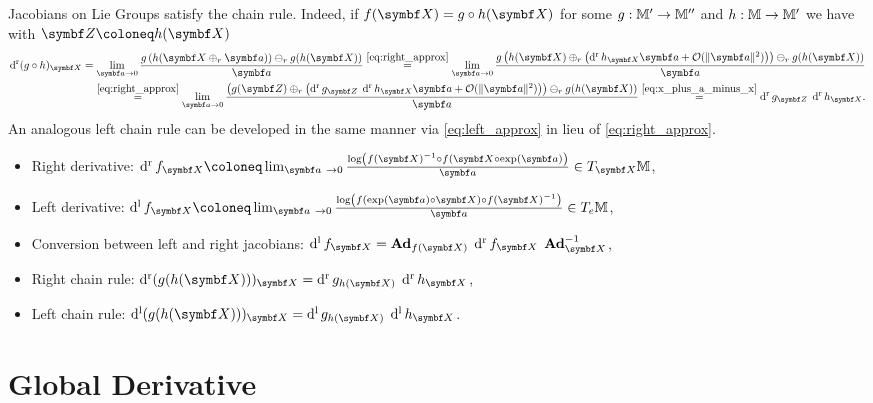 Jacobians on Lie Groups satisfy the chain rule. Indeed, if $f(\X) = g \circ h (\X)$ for some $g : {\mathbb{M}}' \rightarrow {\mathbb{M}}''$ and $h : {\mathbb{M}} \rightarrow {\mathbb{M}}'$ we have with $\Z \coloneq h(\X)$
\begin{equation}
  \label{eq:chain_rule}
  \begin{aligned}
    \dr (g \circ h)_\X = \lim_{\a \rightarrow 0} \frac{g \left( h( \X \oplus_r \a ) \right) \ominus_r g(h(\X))}{\a}  \overset{\eqref{eq:right_approx}} = \lim_{\a \rightarrow 0} \frac{g \left( h( \X ) \oplus_r \left( \dr h_\X \a + \mathcal O(\|\a\|^2) \right)  \right) \ominus_r g(h(\X))}{\a} \\
    \overset{\eqref{eq:right_approx}} = \lim_{\a \rightarrow 0} \frac{ \left( g (\Z) \oplus_r \left( \dr g_\Z \;  \dr h_\X \a + \mathcal O(\| \a \|^2) \right) \right) \ominus_r g(h(\X))}{\a} \overset{\eqref{eq:x_plus_a_minus_x}}= \dr g_\Z \;  \dr h_\X.
  \end{aligned}
\end{equation}
An analogous left chain rule can be developed in the same manner via \eqref{eq:left_approx} in lieu of \eqref{eq:right_approx}.

\begin{properties}[title=Important formulas for Lie group derivatives]
  \begin{itemize}
    \item Right derivative: $\dr f_\X \coloneq \lim_{\a\ \rightarrow 0} \frac{\log \left( f(\X)^{-1} \circ  f(\X \circ \exp(\a) \right)}{\a} \in T_\X \M$,
    \item Left derivative: $\dl f_\X \coloneq \lim_{\a\ \rightarrow 0} \frac{\log \left( f(\exp(\a) \circ \X) \circ  f(\X)^{-1} \right)}{\a} \in T_\id \M$,
    \item Conversion between left and right jacobians: $\dl f_\X = \bAd_{f(\X)} \; \dr f_\X \; \bAd_{\X}^{-1}$,
    \item Right chain rule: $\dr (g (h(\X)))_\X =  \dr g_{h(\X)} \;  \dr h_\X$,
    \item Left chain rule: $\dl (g (h(\X)))_\X =  \dl g_{h(\X)} \;  \dl h_\X$.
  \end{itemize}
\end{properties}

\section{Global Derivative}

